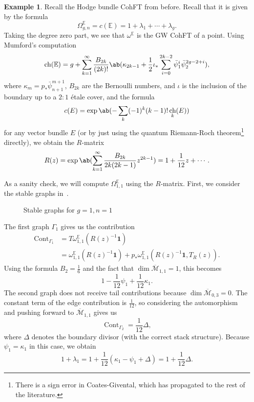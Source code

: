 \documentclass[10pt]{amsart}
\theoremstyle{definition}
\newtheorem{exm}[thm]{Example}
\theoremstyle{remark}
\theoremstyle{plain}
\theoremstyle{definition}
\theoremstyle{remark}
\newcommand{\E}{\mathbb{E}}
\newcommand{\Mbar}{\overline{\mathcal{M}}}
\newcommand{\1}{\mathbf{1}}
\newcommand{\2}{\mathbf{2}}
\newcommand{\3}{\mathbf{3}}
\DeclareMathOperator{\ch}{ch}
\DeclareMathOperator{\Cont}{Cont}
\begin{document}
\begin{exm}
    Recall the Hodge bundle CohFT from before. Recall that it is given by the formula
    \[ \Omega^{\E}_{g,n} = c(\E) = 1 + \lambda_1 + \cdots + \lambda_g. \]
    Taking the degree zero part, we see that $\omega^{\E}$ is the GW CohFT of a point. Using Mumford's computation
    \[ \ch(\E) = g + \sum_{k=1}^{\infty} \frac{B_{2k}}{(2k)!}\ab(\kappa_{2k-1} + \frac{1}{2}\iota_*\sum_{i=0}^{2k-2} \bar{\psi}_1^{i} \bar{\psi}_2^{2g-2+i}), \]
    where $\kappa_{m} = p_* \bar{\psi}_{n+1}^{m+1}$, $B_{2k}$ are the Bernoulli numbers, and $\iota$ is the inclusion of the boundary up to a $2:1$ \'etale cover, and the formula
    \[ c(E) = \exp \ab(-\sum_k (-1)^k (k-1)!\ch_k(E)) \]
    for any vector bundle $E$ (or by just using the quantum Riemann-Roch theorem\footnote{There is a sign error in Coates-Givental, which has propagated to the rest of the literature.} directly), we obtain the $R$-matrix
    \[ R(z) = \exp\ab( \sum_{k=1}^{\infty} \frac{B_{2k}}{2k(2k-1)} z^{2k-1}) = 1+\frac{1}{12}z + \cdots. \]

    As a sanity check, we will compute $\Omega_{1,1}^{\E}$ using the $R$-matrix. First, we consider the stable graphs in~.
    \begin{figure}[htpb]
    \begin{center}
    \end{center}
    \caption{Stable graphs for $g=1, n=1$}%
    \label{fig:03graphloop}
    \end{figure}
    The first graph $\Gamma_1$ gives us the contribution
    \begin{align*}
        \Cont_{\Gamma_1} &= T\omega_{1,1}^{\E}(R(z)^{-1}\1) \\
        &= \omega_{1,1}^{\E}(R(z)^{-1}\1) + p_* \omega_{1,1}^{\E}(R(z)^{-1}\1, T_R(z)).
    \end{align*}
    Using the formula $B_2 = \frac{1}{6}$ and the fact that $\dim \Mbar_{1,1} = 1$, this becomes
    \[ 1 - \frac{1}{12}\psi_1 + \frac{1}{12} \kappa_1. \]
    The second graph does not receive tail contributions because $\dim \Mbar_{0,3} = 0$. The constant term of the edge contribution is $\frac{1}{12}$, so considering the automorphism and pushing forward to $\Mbar_{1,1}$ gives us
    \[ \Cont_{\Gamma_2} = \frac{1}{12} \Delta, \]
    where $\Delta$ denotes the boundary divisor (with the correct stack structure). Because $\psi_1 = \kappa_1$ in this case, we obtain
    \[ 1+\lambda_1 = 1 + \frac{1}{12}(\kappa_1 - \psi_1 + \Delta) = 1 + \frac{1}{12} \Delta. \]
\end{exm}
\end{document}
